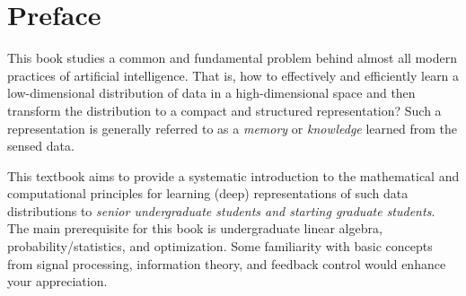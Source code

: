 \documentclass[\toplevelprefix/book-main.tex]{subfiles}
\begin{document}
\chapter*{Preface}

This book studies a common and fundamental problem behind almost all modern practices of artificial intelligence. That is, how to effectively and efficiently learn a low-dimensional distribution of data in a high-dimensional space and then transform the distribution to a compact and structured representation? Such a representation is  generally referred to as a {\em memory} or {\em knowledge} learned from the sensed data. 

This textbook aims to provide a systematic introduction to the mathematical and computational principles for learning (deep) representations of such data distributions to {\em senior undergraduate students and starting graduate students}. The main prerequisite for this book is undergraduate linear algebra, probability/statistics, and optimization. Some familiarity with basic concepts from signal processing, information theory, and feedback control would enhance your appreciation. 
\end{document}

